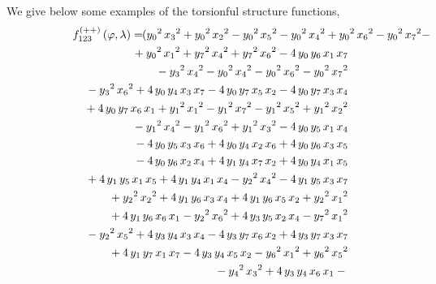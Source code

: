 \documentclass[a4paper,12pt]{book}
\begin{document}
We give below some examples of the torsionful structure functions, 
\begin{eqnarray*}
\lefteqn{f_{123}^{\left( ++\right) }\left( \varphi ,\lambda \right)
=\!\!(y_{0}{}^{2}\,x_{3}{}^{2}+y_{0}{}^{2}\,x_{2}{}^{2}-y_{0}{}^{2}%
\,x_{5}{}^{2}-y_{0}{}^{2}\,x_{4}{}^{2}+y_{0}{}^{2}\,x_{6}{}^{2}-y_{0}{}^{2}%
\,x_{7}{}^{2}-} \\
&&\mbox{}+{y_{0}}^{2}\,{x_{1}}^{2}+{y_{7}}^{2}\,{x_{4}}^{2}+{y_{7}}^{2}\,{%
x_{6}}^{2}-4\,{y_{0}}\,{y_{6}}\,{x_{1}}\,{x_{7}} \\
&&\mbox{}-{y_{3}}^{2}\,{x_{4}}^{2}-y_{0}{}^{2}\,x_{4}{}^{2}-y_{0}{}^{2}%
\,x_{6}{}^{2}-y_{0}{}^{2}\,x_{7}{}^{2} \\
&&\mbox{}-{y_{3}}^{2}\,{x_{6}}^{2}+4\,{y_{0}}\,{y_{4}}\,{x_{3}}\,{x_{7}}-4\,{%
y_{0}}\,{y_{7}}\,{x_{5}}\,{x_{2}}-4\,{y_{0}}\,{y_{7}}\,{x_{3}}\,{x_{4}} \\
&&\mbox{}+4\,{y_{0}}\,{y_{7}}\,{x_{6}}\,{x_{1}}+{y_{1}}^{2}\,{x_{1}}^{2}-{%
y_{1}}^{2}\,{x_{7}}^{2}-{y_{1}}^{2}\,{x_{5}}^{2}+{y_{1}}^{2}\,{x_{2}}^{2} \\
&&\mbox{}-{y_{1}}^{2}\,{x_{4}}^{2}-{y_{1}}^{2}\,{x_{6}}^{2}+{y_{1}}^{2}\,{%
x_{3}}^{2}-4\,{y_{0}}\,{y_{5}}\,{x_{1}}\,{x_{4}} \\
&&\mbox{}-4\,{y_{0}}\,{y_{5}}\,{x_{3}}\,{x_{6}}+4\,{y_{0}}\,{y_{4}}\,{x_{2}}%
\,{x_{6}}+4\,{y_{0}}\,{y_{6}}\,{x_{3}}\,{x_{5}} \\
&&\mbox{}-4\,{y_{0}}\,{y_{6}}\,{x_{2}}\,{x_{4}}+4\,{y_{1}}\,{y_{4}}\,{x_{7}}%
\,{x_{2}}+4\,{y_{0}}\,{y_{4}}\,{x_{1}}\,{x_{5}} \\
&&\mbox{}+4\,{y_{1}}\,{y_{5}}\,{x_{1}}\,{x_{5}}+4\,{y_{1}}\,{y_{4}}\,{x_{1}}%
\,{x_{4}}-{y_{2}}^{2}\,{x_{4}}^{2}-4\,{y_{1}}\,{y_{5}}\,{x_{3}}\,{x_{7}} \\
&&\mbox{}+{y_{2}}^{2}\,{x_{2}}^{2}+4\,{y_{1}}\,{y_{6}}\,{x_{3}}\,{x_{4}}+4\,{%
y_{1}}\,{y_{6}}\,{x_{5}}\,{x_{2}}+{y_{2}}^{2}\,{x_{1}}^{2} \\
&&\mbox{}+4\,{y_{1}}\,{y_{6}}\,{x_{6}}\,{x_{1}}-{y_{2}}^{2}\,{x_{6}}^{2}+4\,{%
y_{3}}\,{y_{5}}\,{x_{2}}\,{x_{4}}-{y_{7}}^{2}\,{x_{1}}^{2} \\
&&\mbox{}-{y_{2}}^{2}\,{x_{5}}^{2}+4\,{y_{3}}\,{y_{4}}\,{x_{3}}\,{x_{4}}-4\,{%
y_{3}}\,{y_{7}}\,{x_{6}}\,{x_{2}}+4\,{y_{3}}\,{y_{7}}\,{x_{3}}\,{x_{7}} \\
&&\mbox{}+4\,{y_{1}}\,{y_{7}}\,{x_{1}}\,{x_{7}}-4\,{y_{3}}\,{y_{4}}\,{x_{5}}%
\,{x_{2}}-{y_{6}}^{2}\,{x_{1}}^{2}+{y_{6}}^{2}\,{x_{5}}^{2} \\
&&\mbox{}-{y_{4}}^{2}\,{x_{3}}^{2}+4\,{y_{3}}\,{y_{4}}\,{x_{6}}\,{x_{1}}-{%
}
\end{eqnarray*}
\end{document}
